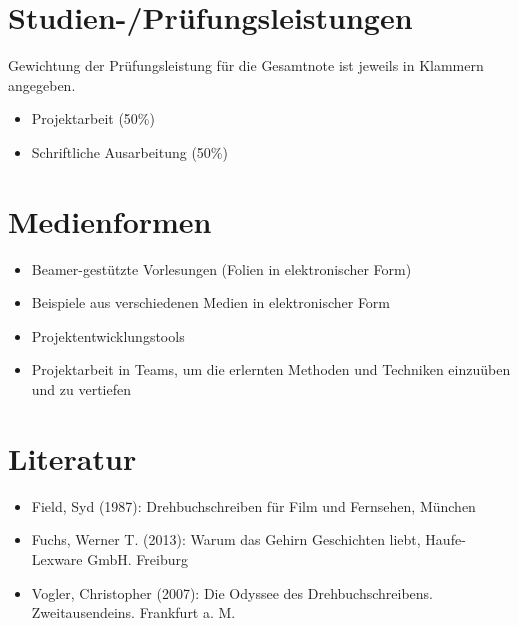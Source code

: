 \section*{Studien-/Prüfungsleistungen\label{/mi-2017/modulbeschreibungen-master/MA_VC_Modul_Storytelling}}\label{studien-pruxfcfungsleistungenpathlabelmi-2017modulbeschreibungen-mastermaux5fvcux5fmodulux5fstorytelling}

Gewichtung der Prüfungsleistung für die Gesamtnote ist jeweils in
Klammern angegeben.

\begin{itemize}
\tightlist
\item
  Projektarbeit (50\%)
\item
  Schriftliche Ausarbeitung (50\%)
\end{itemize}

\section*{Medienformen\label{/mi-2017/modulbeschreibungen-master/MA_VC_Modul_Storytelling}}\label{medienformenpathlabelmi-2017modulbeschreibungen-mastermaux5fvcux5fmodulux5fstorytelling}

\begin{itemize}
\tightlist
\item
  Beamer-gestützte Vorlesungen (Folien in elektronischer Form)
\item
  Beispiele aus verschiedenen Medien in elektronischer Form
\item
  Projektentwicklungstools
\item
  Projektarbeit in Teams, um die erlernten Methoden und Techniken
  einzuüben und zu vertiefen
\end{itemize}

\section*{Literatur\label{/mi-2017/modulbeschreibungen-master/MA_VC_Modul_Storytelling}}\label{literaturpathlabelmi-2017modulbeschreibungen-mastermaux5fvcux5fmodulux5fstorytelling}

\begin{itemize}
\tightlist
\item
  Field, Syd (1987): Drehbuchschreiben für Film und Fernsehen, München
\item
  Fuchs, Werner T. (2013): Warum das Gehirn Geschichten liebt,
  Haufe-Lexware GmbH. Freiburg
\item
  Vogler, Christopher (2007): Die Odyssee des Drehbuchschreibens.
  Zweitausendeins. Frankfurt a. M.
\end{itemize}

